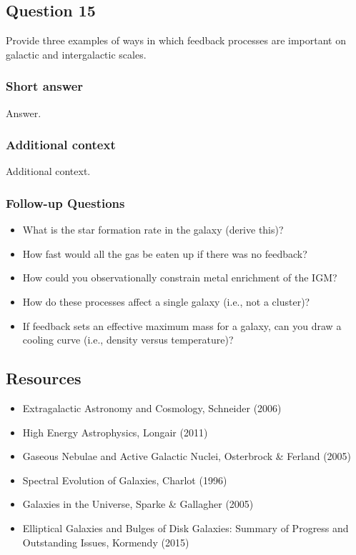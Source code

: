 \documentclass[a4paper,11pt]{article}
\begin{document}

\newpage
\subsection{Question 15}

Provide three examples of ways in which feedback processes are important on galactic and intergalactic scales.

\subsubsection{Short answer}

Answer.

\subsubsection{Additional context}

Additional context.

\subsubsection{Follow-up Questions}

\begin{itemize}
    \item What is the star formation rate in the galaxy (derive this)? 
    \item How fast would all the gas be eaten up if there was no feedback?
    \item How could you observationally constrain metal enrichment of the IGM?
    \item How do these processes affect a single galaxy (i.e., not a cluster)?
    \item If feedback sets an effective maximum mass for a galaxy, can you draw a cooling curve (i.e., density versus temperature)? 
\end{itemize}


\newpage
\subsection{Resources}

\begin{itemize}
    \item Extragalactic Astronomy and Cosmology, Schneider (2006)
    \item High Energy Astrophysics, Longair (2011)
    \item Gaseous Nebulae and Active Galactic Nuclei, Osterbrock \& Ferland (2005)
    \item Spectral Evolution of Galaxies, Charlot (1996)
    \item Galaxies in the Universe, Sparke \& Gallagher (2005)
    \item Elliptical Galaxies and Bulges of Disk Galaxies: Summary of Progress and Outstanding Issues, Kormendy (2015)
\end{itemize}
\end{document}
